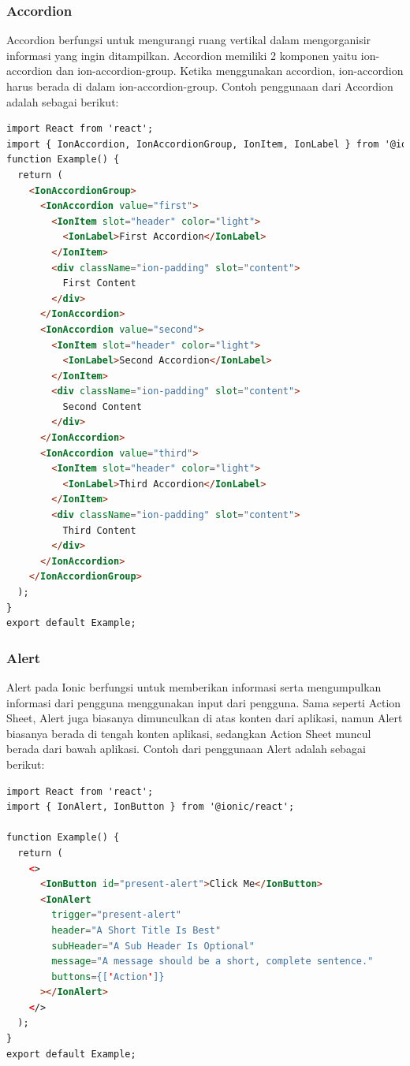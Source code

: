 \subsubsection{Accordion}
Accordion berfungsi untuk mengurangi ruang vertikal dalam mengorganisir informasi yang ingin ditampilkan. Accordion memiliki 2 komponen yaitu ion-accordion dan ion-accordion-group. Ketika menggunakan accordion, ion-accordion harus berada di dalam ion-accordion-group. Contoh penggunaan dari Accordion adalah sebagai berikut:

\begin{lstlisting}[language=HTML, caption=Contoh kode untuk membuat Accordion, label=kode:ion-accordion]
import React from 'react';
import { IonAccordion, IonAccordionGroup, IonItem, IonLabel } from '@ionic/react';
function Example() {
  return (
    <IonAccordionGroup>
      <IonAccordion value="first">
        <IonItem slot="header" color="light">
          <IonLabel>First Accordion</IonLabel>
        </IonItem>
        <div className="ion-padding" slot="content">
          First Content
        </div>
      </IonAccordion>
      <IonAccordion value="second">
        <IonItem slot="header" color="light">
          <IonLabel>Second Accordion</IonLabel>
        </IonItem>
        <div className="ion-padding" slot="content">
          Second Content
        </div>
      </IonAccordion>
      <IonAccordion value="third">
        <IonItem slot="header" color="light">
          <IonLabel>Third Accordion</IonLabel>
        </IonItem>
        <div className="ion-padding" slot="content">
          Third Content
        </div>
      </IonAccordion>
    </IonAccordionGroup>
  );
}
export default Example;
\end{lstlisting}

\subsubsection{Alert}
Alert pada Ionic berfungsi untuk memberikan informasi serta mengumpulkan informasi dari pengguna menggunakan input dari pengguna. Sama seperti Action Sheet, Alert juga biasanya dimunculkan di atas konten dari aplikasi, namun Alert biasanya berada di tengah konten aplikasi, sedangkan Action Sheet muncul berada dari bawah aplikasi. Contoh dari penggunaan Alert adalah sebagai berikut:

\begin{lstlisting}[language=HTML, caption=Contoh kode untuk membuat Alert, label=kode:ion-alert]
import React from 'react';
import { IonAlert, IonButton } from '@ionic/react';

function Example() {
  return (
    <>
      <IonButton id="present-alert">Click Me</IonButton>
      <IonAlert
        trigger="present-alert"
        header="A Short Title Is Best"
        subHeader="A Sub Header Is Optional"
        message="A message should be a short, complete sentence."
        buttons={['Action']}
      ></IonAlert>
    </>
  );
}
export default Example;
\end{lstlisting}

